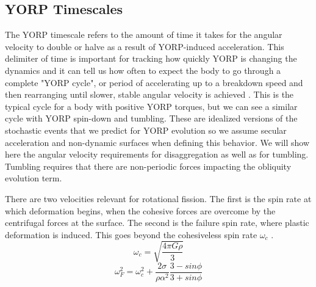 \documentclass[12pt,notitlepage]{article}
\begin{document}
\subsection{YORP Timescales}
The YORP timescale refers to the amount of time it takes for the angular velocity to double or halve as a result of YORP-induced acceleration. This delimiter of time is important for tracking how quickly YORP is changing the dynamics and it can tell us how often to expect the body to go through a complete "YORP cycle", or period of accelerating up to a breakdown speed and then rearranging until slower, stable angular velocity is achieved \cite{Scheeres2019}. This is the typical cycle for a body with positive YORP torques, but we can see a similar cycle with YORP spin-down and tumbling. These are idealized versions of the stochastic events that we predict for YORP evolution so we assume secular acceleration and non-dynamic surfaces when defining this behavior. We will show here the angular velocity requirements for disaggregation as well as for tumbling. Tumbling requires that there are non-periodic forces impacting the obliquity evolution term. %



There are two velocities relevant for rotational fission. The first is the spin rate at which deformation begins, when the cohesive forces are overcome by the centrifugal forces at the surface. The second is the failure spin rate, where plastic deformation is induced. This goes beyond the cohesiveless spin rate $\omega_c$ \cite{Scheeres2018}\cite{Sanchez2014}.
\begin{equation}
    \omega_{c} = \sqrt{\frac{4\pi \mathit{G}\rho}{3}}
\end{equation}
\begin{equation}
    \omega^2_F = \omega^2_c + \frac{2\sigma}{\rho \alpha^2} \frac{3 - sin \phi}{3 + sin \phi}
\end{equation}

\begin{figure}
\end{figure}

\end{document}
